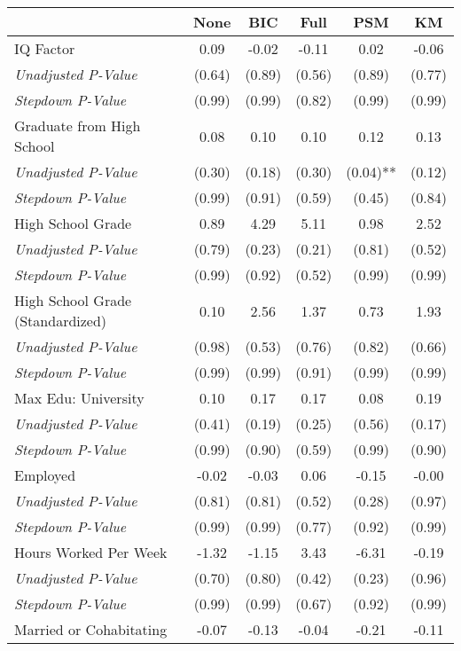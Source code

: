 \begin{tabular}{l c c c c c}
\toprule
 & None & BIC & Full & PSM & KM \\
\midrule
IQ Factor & 0.09 & -0.02 & -0.11 & 0.02 & -0.06 \\
\quad \textit{Unadjusted P-Value} & (0.64) & (0.89) & (0.56) & (0.89) & (0.77) \\
\quad \textit{Stepdown P-Value} & (0.99) & (0.99) & (0.82) & (0.99) & (0.99) \\
Graduate from High School & 0.08 & 0.10 & 0.10 & 0.12 & 0.13 \\
\quad \textit{Unadjusted P-Value} & (0.30) & (0.18) & (0.30) & (0.04)** & (0.12) \\
\quad \textit{Stepdown P-Value} & (0.99) & (0.91) & (0.59) & (0.45) & (0.84) \\
High School Grade & 0.89 & 4.29 & 5.11 & 0.98 & 2.52 \\
\quad \textit{Unadjusted P-Value} & (0.79) & (0.23) & (0.21) & (0.81) & (0.52) \\
\quad \textit{Stepdown P-Value} & (0.99) & (0.92) & (0.52) & (0.99) & (0.99) \\
High School Grade (Standardized) & 0.10 & 2.56 & 1.37 & 0.73 & 1.93 \\
\quad \textit{Unadjusted P-Value} & (0.98) & (0.53) & (0.76) & (0.82) & (0.66) \\
\quad \textit{Stepdown P-Value} & (0.99) & (0.99) & (0.91) & (0.99) & (0.99) \\
Max Edu: University & 0.10 & 0.17 & 0.17 & 0.08 & 0.19 \\
\quad \textit{Unadjusted P-Value} & (0.41) & (0.19) & (0.25) & (0.56) & (0.17) \\
\quad \textit{Stepdown P-Value} & (0.99) & (0.90) & (0.59) & (0.99) & (0.90) \\
Employed & -0.02 & -0.03 & 0.06 & -0.15 & -0.00 \\
\quad \textit{Unadjusted P-Value} & (0.81) & (0.81) & (0.52) & (0.28) & (0.97) \\
\quad \textit{Stepdown P-Value} & (0.99) & (0.99) & (0.77) & (0.92) & (0.99) \\
Hours Worked Per Week & -1.32 & -1.15 & 3.43 & -6.31 & -0.19 \\
\quad \textit{Unadjusted P-Value} & (0.70) & (0.80) & (0.42) & (0.23) & (0.96) \\
\quad \textit{Stepdown P-Value} & (0.99) & (0.99) & (0.67) & (0.92) & (0.99) \\
Married or Cohabitating & -0.07 & -0.13 & -0.04 & -0.21 & -0.11 \\

\end{tabular}
